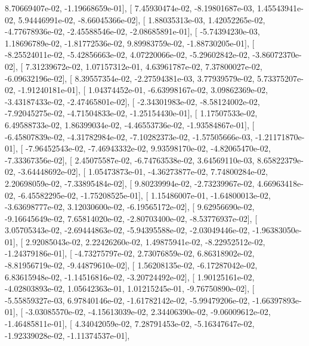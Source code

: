 \documentclass{article}
\begin{document}
          8.70669407e-02,  -1.19668659e-01],
       [  7.45930474e-02,  -8.19801687e-03,   1.45543941e-02,
          5.94446991e-02,  -8.66045366e-02],
       [  1.88035313e-03,   1.42052265e-02,  -4.77678936e-02,
         -2.45588546e-02,  -2.08685891e-01],
       [ -5.74394230e-03,   1.18696789e-02,  -1.81772536e-02,
          9.89983759e-02,  -1.88730205e-01],
       [ -8.25524011e-02,  -5.42856663e-02,   4.07220066e-02,
         -5.29602842e-02,  -3.86072370e-02],
       [  7.31239672e-02,   1.07157312e-01,   4.63961787e-02,
          7.37800027e-02,  -6.09632196e-02],
       [  8.39557354e-02,  -2.27594381e-03,   3.77939579e-02,
          5.73375207e-02,  -1.91240181e-01],
       [  1.04374452e-01,  -6.63998167e-02,   3.09862369e-02,
         -3.43187433e-02,  -2.47465801e-02],
       [ -2.34301983e-02,  -8.58124002e-02,  -7.92045275e-02,
         -4.71504833e-02,  -1.25154430e-01],
       [  1.17507533e-02,   6.49588733e-02,   1.86399034e-02,
         -4.46553736e-02,  -1.93584867e-01],
       [ -6.45807839e-02,  -4.31782984e-02,  -7.10282373e-02,
         -1.57505666e-03,  -1.21171870e-01],
       [ -7.96452543e-02,  -7.46943332e-02,   9.93598170e-02,
         -4.82065470e-02,  -7.33367356e-02],
       [  2.45075587e-02,  -6.74763538e-02,   3.64569110e-03,
          8.65822379e-02,  -3.64448692e-02],
       [  1.05473873e-01,  -4.36273877e-02,   7.74800284e-02,
          2.20698059e-02,  -7.33895484e-02],
       [  9.80239994e-02,  -2.73239967e-02,   4.66963418e-02,
         -6.45582295e-02,  -1.75208525e-01],
       [  1.15486007e-01,  -1.64800013e-02,  -3.63698777e-02,
          3.12030600e-02,  -6.19565172e-02],
       [  9.62956690e-02,  -9.16645649e-02,   7.65814020e-02,
         -2.80703400e-02,  -8.53776937e-02],
       [  3.05705343e-02,  -2.69444863e-02,  -5.94395588e-02,
         -2.03049446e-02,  -1.96383050e-01],
       [  2.92085043e-02,   2.22426260e-02,   1.49875941e-02,
         -8.22952512e-02,  -1.24379186e-01],
       [ -4.73275797e-02,   2.73076859e-02,   6.86318902e-02,
         -8.81956719e-02,  -9.44879610e-02],
       [  1.56208135e-02,  -6.17287042e-02,   6.83615948e-02,
         -1.14516816e-02,  -3.20724492e-02],
       [  1.90125161e-02,  -4.02803893e-02,   1.05642363e-01,
          1.01215245e-01,  -9.76750890e-02],
       [ -5.55859327e-03,   6.97840146e-02,  -1.61782142e-02,
         -5.99479206e-02,  -1.66397893e-01],
       [ -3.03085570e-02,  -4.15613039e-02,   2.34406390e-02,
         -9.06009612e-02,  -1.46485811e-01],
       [  4.34042059e-02,   7.28791453e-02,  -5.16347647e-02,
         -1.92339028e-02,  -1.11374537e-01],
\end{document}
